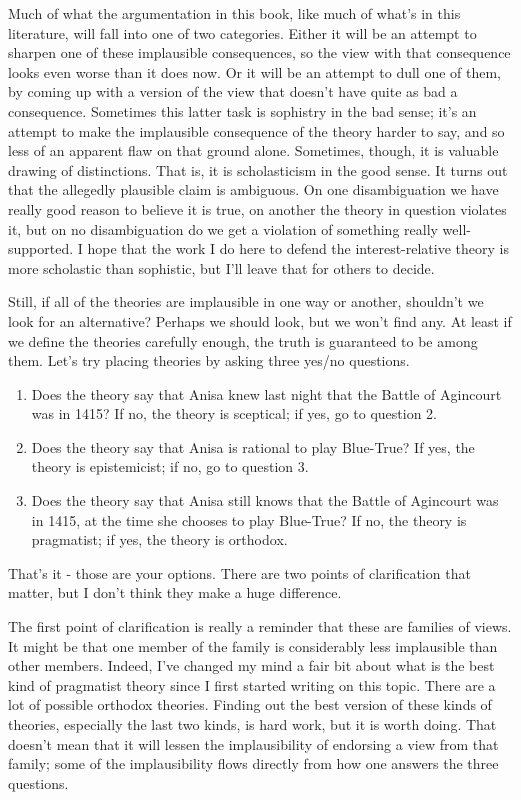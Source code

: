 \documentclass[
  10pt,
  letterpaper,
  twoside]{scrbook}
\providecommand{\tightlist}{%
  \setlength{\itemsep}{0pt}\setlength{\parskip}{0pt}}\usepackage{longtable,booktabs,array}
\begin{document}
Much of what the argumentation in this book, like much of what's in this
literature, will fall into one of two categories. Either it will be an
attempt to sharpen one of these implausible consequences, so the view
with that consequence looks even worse than it does now. Or it will be
an attempt to dull one of them, by coming up with a version of the view
that doesn't have quite as bad a consequence. Sometimes this latter task
is sophistry in the bad sense; it's an attempt to make the implausible
consequence of the theory harder to say, and so less of an apparent flaw
on that ground alone. Sometimes, though, it is valuable drawing of
distinctions. That is, it is scholasticism in the good sense. It turns
out that the allegedly plausible claim is ambiguous. On one
disambiguation we have really good reason to believe it is true, on
another the theory in question violates it, but on no disambiguation do
we get a violation of something really well-supported. I hope that the
work I do here to defend the interest-relative theory is more scholastic
than sophistic, but I'll leave that for others to decide.

Still, if all of the theories are implausible in one way or another,
shouldn't we look for an alternative? Perhaps we should look, but we
won't find any. At least if we define the theories carefully enough, the
truth is guaranteed to be among them. Let's try placing theories by
asking three yes/no questions.

\begin{enumerate}
\def\labelenumi{\arabic{enumi}.}
\tightlist
\item
  Does the theory say that Anisa knew last night that the Battle of
  Agincourt was in 1415? If no, the theory is sceptical; if yes, go to
  question 2.
\item
  Does the theory say that Anisa is rational to play Blue-True? If yes,
  the theory is epistemicist; if no, go to question 3.
\item
  Does the theory say that Anisa still knows that the Battle of
  Agincourt was in 1415, at the time she chooses to play Blue-True? If
  no, the theory is pragmatist; if yes, the theory is orthodox.
\end{enumerate}

That's it - those are your options. There are two points of
clarification that matter, but I don't think they make a huge
difference.

The first point of clarification is really a reminder that these are
families of views. It might be that one member of the family is
considerably less implausible than other members. Indeed, I've changed
my mind a fair bit about what is the best kind of pragmatist theory
since I first started writing on this topic. There are a lot of possible
orthodox theories. Finding out the best version of these kinds of
theories, especially the last two kinds, is hard work, but it is worth
doing. That doesn't mean that it will lessen the implausibility of
endorsing a view from that family; some of the implausibility flows
directly from how one answers the three questions.
\end{document}
